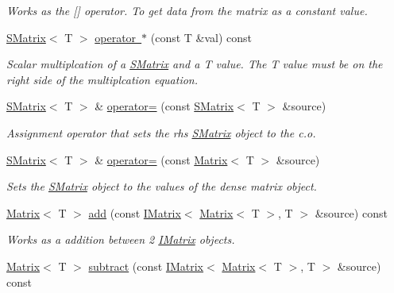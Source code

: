 \begin{DoxyCompactItemize}
\begin{DoxyCompactList}\small\item\em Works as the \mbox{[}\mbox{]} operator. To get data from the matrix as a constant value. \end{DoxyCompactList}\item 
\mbox{\hyperlink{class_s_matrix}{S\+Matrix}}$<$ T $>$ \mbox{\hyperlink{class_s_matrix_aa01badd1e585fe9c362d21bc79925c80}{operator $\ast$}} (const T \&val) const
\begin{DoxyCompactList}\small\item\em Scalar multiplcation of a \mbox{\hyperlink{class_s_matrix}{S\+Matrix}} and a T value. The T value must be on the right side of the multiplcation equation. \end{DoxyCompactList}\item 
\mbox{\hyperlink{class_s_matrix}{S\+Matrix}}$<$ T $>$ \& \mbox{\hyperlink{class_s_matrix_a8cd6e37560a4cb9fd35e9120ed680135}{operator=}} (const \mbox{\hyperlink{class_s_matrix}{S\+Matrix}}$<$ T $>$ \&source)
\begin{DoxyCompactList}\small\item\em Assignment operator that sets the rhs \mbox{\hyperlink{class_s_matrix}{S\+Matrix}} object to the c.\+o. \end{DoxyCompactList}\item 
\mbox{\hyperlink{class_s_matrix}{S\+Matrix}}$<$ T $>$ \& \mbox{\hyperlink{class_s_matrix_ac10022d6890da5a33eaadf92c52af1e1}{operator=}} (const \mbox{\hyperlink{class_matrix}{Matrix}}$<$ T $>$ \&source)
\begin{DoxyCompactList}\small\item\em Sets the \mbox{\hyperlink{class_s_matrix}{S\+Matrix}} object to the values of the dense matrix object. \end{DoxyCompactList}\item 
\mbox{\hyperlink{class_matrix}{Matrix}}$<$ T $>$ \mbox{\hyperlink{class_s_matrix_a1e1a79da5af6b1f7332afb26b391acbe}{add}} (const \mbox{\hyperlink{class_i_matrix}{I\+Matrix}}$<$ \mbox{\hyperlink{class_matrix}{Matrix}}$<$ T $>$, T $>$ \&source) const
\begin{DoxyCompactList}\small\item\em Works as a addition between 2 \mbox{\hyperlink{class_i_matrix}{I\+Matrix}} objects. \end{DoxyCompactList}\item 
\mbox{\hyperlink{class_matrix}{Matrix}}$<$ T $>$ \mbox{\hyperlink{class_s_matrix_ad2978078bf594d7e85832cd5dcf85b6d}{subtract}} (const \mbox{\hyperlink{class_i_matrix}{I\+Matrix}}$<$ \mbox{\hyperlink{class_matrix}{Matrix}}$<$ T $>$, T $>$ \&source) const

\end{DoxyCompactItemize}
